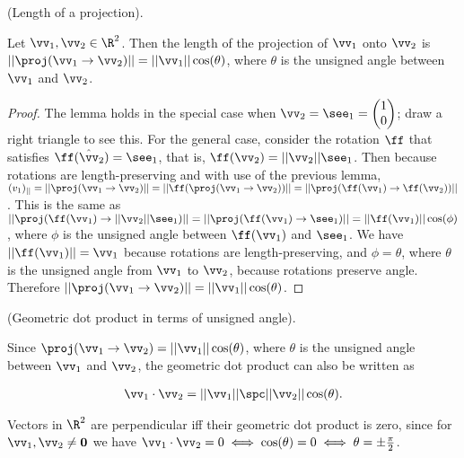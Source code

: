 
    \begin{lemma}
    \label{ch::lin_alg::lemma::polar}
        (Length of a projection).
        
        Let $\vv_1, \vv_2 \in \R^2$. Then the length of the projection of $\vv_1$ onto $\vv_2$ is $||\proj(\vv_1 \rightarrow \vv_2)|| = ||\vv_1||\cos(\theta)$, where $\theta$ is the unsigned angle between $\vv_1$ and $\vv_2$.
    \end{lemma}
    
    \begin{proof}
        The lemma holds in the special case when $\vv_2 = \see_1 = \begin{pmatrix} 1 \\ 0 \end{pmatrix}$; draw a right triangle to see this. For the general case, consider the rotation $\ff$ that satisfies $\ff(\hat{\vv}_2) = \see_1$, that is, $\ff(\vv_2) = ||\vv_2|| \see_1$. Then because rotations are length-preserving and with use of the previous lemma, $(v_1)_{||} = ||\proj(\vv_1 \rightarrow \vv_2)|| = ||\ff(\proj(\vv_1 \rightarrow \vv_2))|| = ||\proj(\ff(\vv_1) \rightarrow \ff(\vv_2))||$. This is the same as $||\proj(\ff(\vv_1) \rightarrow ||\vv_2|| \see_1)|| = ||\proj(\ff(\vv_1) \rightarrow \see_1)|| = ||\ff(\vv_1)||\cos(\phi)$, where $\phi$ is the unsigned angle between $\ff(\vv_1)$ and $\see_1$. We have $||\ff(\vv_1)|| = \vv_1$ because rotations are length-preserving, and $\phi = \theta$, where $\theta$ is the unsigned angle from $\vv_1$ to $\vv_2$, because rotations preserve angle. Therefore $||\proj(\vv_1 \rightarrow \vv_2)|| = ||\vv_1||\cos(\theta)$.
    \end{proof}
    
    
    \begin{theorem}
        (Geometric dot product in terms of unsigned angle).
        
        Since $\proj(\vv_1 \rightarrow \vv_2) = ||\vv_1||\cos(\theta)$, where $\theta$ is the unsigned angle between $\vv_1$ and $\vv_2$, the geometric dot product can also be written as
        
        \begin{align*}
            \vv_1 \cdot \vv_2 = ||\vv_1|| \spc ||\vv_2|| \cos(\theta).
        \end{align*}
    \end{theorem}

    \begin{remark}
        Vectors in $\R^2$ are perpendicular iff their geometric dot product is zero, since for $\vv_1, \vv_2 \neq \mathbf{0}$ we have $\vv_1 \cdot \vv_2 = 0 \iff \cos(\theta) = 0 \iff \theta = \pm \frac{\pi}{2}$.    
    \end{remark}
    
